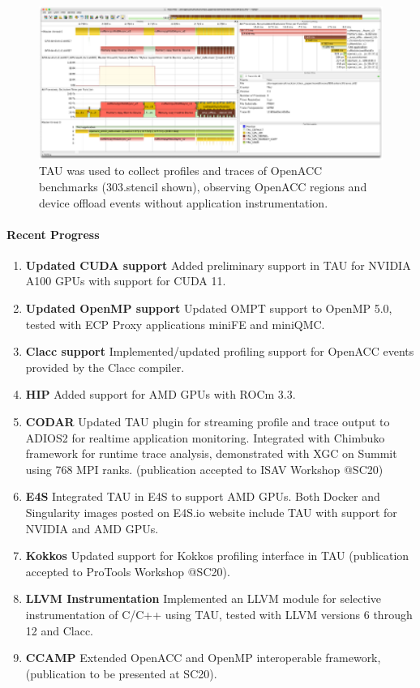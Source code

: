 \begin{figure}[htb]
\centering
\includegraphics[width=6in]{projects/2.3.2-Tools/2.3.2.10-PROTEAS-YTUNE/clacc_tau.png}
\caption{TAU was used to collect profiles and traces of OpenACC benchmarks (303.stencil shown), observing OpenACC regions and device offload events without application instrumentation.}
\label{figure:tau}
\end{figure}

\paragraph{Recent Progress}
\begin{enumerate}
\item \textbf{Updated CUDA support} Added preliminary support in TAU for NVIDIA A100 GPUs with support for CUDA 11.

\item \textbf{Updated OpenMP support} Updated OMPT support to OpenMP 5.0, tested with ECP Proxy applications miniFE and miniQMC.

\item \textbf{Clacc support} Implemented/updated profiling support for OpenACC events provided by the Clacc compiler.

\item \textbf{HIP} Added support for AMD GPUs with ROCm 3.3.

\item \textbf{CODAR} Updated TAU plugin for streaming profile and trace output to ADIOS2 for realtime application monitoring.  Integrated with Chimbuko framework for runtime trace analysis, demonstrated with XGC on Summit using 768 MPI ranks. (publication accepted to ISAV Workshop @SC20)

\item \textbf{E4S} Integrated TAU in E4S to support AMD GPUs. Both Docker and Singularity images posted on E4S.io website include TAU with support for NVIDIA and AMD GPUs.

\item \textbf{Kokkos} Updated support for Kokkos profiling interface in TAU (publication accepted to ProTools Workshop @SC20).

\item \textbf{LLVM Instrumentation} Implemented an LLVM module for selective instrumentation of C/C++ using TAU, tested with LLVM versions 6 through 12 and Clacc.

\item \textbf{CCAMP} Extended OpenACC and OpenMP interoperable framework, (publication to be presented at SC20).
\end{enumerate}

